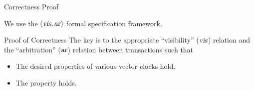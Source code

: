 
\begin{frame}{Correctness Proof}
  \begin{center}
    We use the $(\textsl{vis}, \textsl{ar})$ formal specification framework.

    \vspace{0.60cm}
  \end{center}
\end{frame}

\begin{frame}{Proof of Correctness}
  The key is to  the appropriate ``visibility'' ($\textsl{vis}$) relation
  and the ``arbitration'' ($\textsl{ar}$) relation between transactions such that \\[10pt]

  \begin{itemize}
    \setlength{\itemsep}{8pt}
    \item The desired properties of various vector clocks hold.
    \item The  property holds.
  \end{itemize}
\end{frame}
